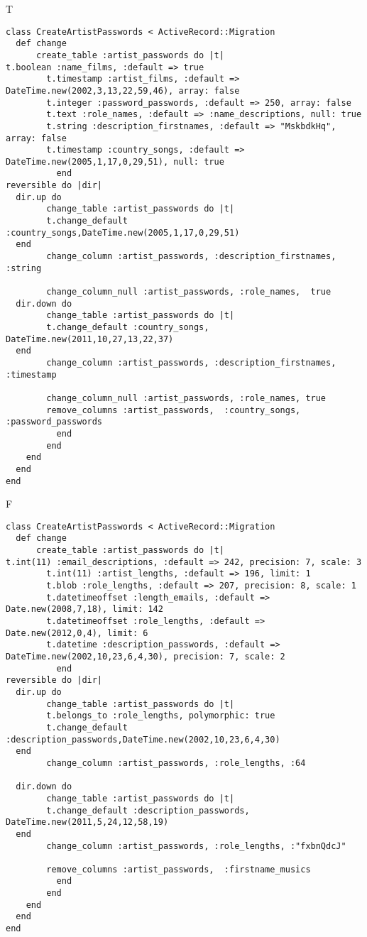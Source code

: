 T
\begin{verbatim}
class CreateArtistPasswords < ActiveRecord::Migration
  def change
	  create_table :artist_passwords do |t|
t.boolean :name_films, :default => true
		t.timestamp :artist_films, :default => DateTime.new(2002,3,13,22,59,46), array: false
		t.integer :password_passwords, :default => 250, array: false
		t.text :role_names, :default => :name_descriptions, null: true
		t.string :description_firstnames, :default => "MskbdkHq", array: false
		t.timestamp :country_songs, :default => DateTime.new(2005,1,17,0,29,51), null: true
		  end
reversible do |dir|
  dir.up do
		change_table :artist_passwords do |t|
		t.change_default :country_songs,DateTime.new(2005,1,17,0,29,51)
  end
 		change_column :artist_passwords, :description_firstnames, :string
   
		change_column_null :artist_passwords, :role_names,  true
  dir.down do
		change_table :artist_passwords do |t|
		t.change_default :country_songs, DateTime.new(2011,10,27,13,22,37)
  end
 		change_column :artist_passwords, :description_firstnames, :timestamp
   
		change_column_null :artist_passwords, :role_names, true
 		remove_columns :artist_passwords,  :country_songs, :password_passwords 
	      end
	    end
    end 
  end
end

\end{verbatim}

F
\begin{verbatim}
class CreateArtistPasswords < ActiveRecord::Migration
  def change
	  create_table :artist_passwords do |t|
t.int(11) :email_descriptions, :default => 242, precision: 7, scale: 3
		t.int(11) :artist_lengths, :default => 196, limit: 1
		t.blob :role_lengths, :default => 207, precision: 8, scale: 1
		t.datetimeoffset :length_emails, :default => Date.new(2008,7,18), limit: 142
		t.datetimeoffset :role_lengths, :default => Date.new(2012,0,4), limit: 6
		t.datetime :description_passwords, :default => DateTime.new(2002,10,23,6,4,30), precision: 7, scale: 2
		  end
reversible do |dir|
  dir.up do
		change_table :artist_passwords do |t|
		t.belongs_to :role_lengths, polymorphic: true
 		t.change_default :description_passwords,DateTime.new(2002,10,23,6,4,30)
  end
 		change_column :artist_passwords, :role_lengths, :64
   
  dir.down do
		change_table :artist_passwords do |t|
		t.change_default :description_passwords, DateTime.new(2011,5,24,12,58,19)
  end
 		change_column :artist_passwords, :role_lengths, :"fxbnQdcJ"
   
		remove_columns :artist_passwords,  :firstname_musics 
	      end
	    end
    end 
  end
end

\end{verbatim}

